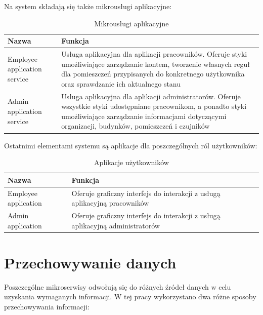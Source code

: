 \documentclass[11pt, a4]{article} %
\begin{document}
Na system składają się także mikrousługi aplikacyjne:

\begin{table}[!ht]
    \caption{Mikrousługi aplikacyjne}
    \label{tab:mikrouslugi-aplikacyjne}
    \begin{tabularx}{1\textwidth} { 
        | >{\raggedright\arraybackslash}X        
        | >{\raggedleft\arraybackslash}X | }
        \hline
       Nazwa & Funkcja \\
       \hline
       Employee application service & 
       Usługa aplikacyjna dla aplikacji pracowników. Oferuje styki umożliwiające 
       zarządzanie kontem, tworzenie własnych reguł dla pomieszczeń przypisanych do 
       konkretnego użytkownika oraz sprawdzanie ich aktualnego stanu \\
       \hline
       Admin application service &
       Usługa aplikacyjna dla aplikacji administratorów. Oferuje wszystkie styki 
       udostępniane pracownikom, a ponadto styki umożliwiające zarządzanie informacjami 
       dotyczącymi organizacji, budynków, pomieszczeń i czujników \\
       \hline
    \end{tabularx}
\end{table}

Ostatnimi elementami systemu są aplikacje dla poszczególnych ról użytkowników:

\begin{table}[!ht]
    \caption{Aplikacje użytkowników}
    \label{tab:aplikacje-uzytkownikow}
    \begin{tabularx}{1\textwidth} { 
        | >{\raggedright\arraybackslash}X        
        | >{\raggedleft\arraybackslash}X | }
        \hline
       Nazwa & Funkcja \\
       \hline
       Employee application & 
       Oferuje graficzny interfejs do interakcji z usługą aplikacyjną pracowników \\
       \hline
       Admin application &
       Oferuje graficzny interfejs do interakcji z usługą aplikacyjną administratorów \\
       \hline
    \end{tabularx}
\end{table}

\section{Przechowywanie danych}

Poszczególne mikroserwisy odwołują się do różnych źródeł danych w celu uzyskania 
wymaganych informacji. W tej pracy wykorzystano dwa różne sposoby przechowywania 
informacji:
\end{document}
